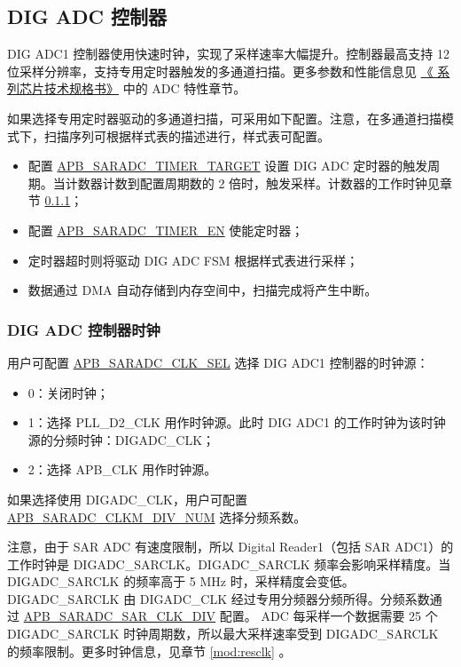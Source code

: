 \documentclass[main\_\_CN.tex]{subfiles}
\begin{document}
\subsection{DIG ADC 控制器}


DIG ADC1 控制器使用快速时钟，实现了采样速率大幅提升。控制器最高支持 12 位采样分辨率，支持专用定时器触发的多通道扫描。更多参数和性能信息见 \href{https://www.espressif.com/sites/default/files/documentation/esp32-s3_datasheet_cn.pdf}{《\chipname{} 系列芯片技术规格书》} 中的 ADC 特性章节。

如果选择专用定时器驱动的多通道扫描，可采用如下配置。注意，在多通道扫描模式下，扫描序列可根据样式表的描述进行，样式表可配置。
\begin{itemize}
        \item 配置 \hyperref[fielddesc:APBSARADCTIMERTARGET]{APB\_SARADC\_TIMER\_TARGET} 设置 DIG ADC 定时器的触发周期。当计数器计数到配置周期数的 2 倍时，触发采样。计数器的工作时钟见章节 \ref{sec:dig-adc-clock}；
        \item 配置 \hyperref[fielddesc:APBSARADCTIMEREN]{APB\_SARADC\_TIMER\_EN} 使能定时器；
        \item 定时器超时则将驱动 DIG ADC FSM 根据样式表进行采样；
        \item 数据通过 DMA 自动存储到内存空间中，扫描完成将产生中断。
\end{itemize}

\subsubsection{DIG ADC 控制器时钟}\label{sec:dig-adc-clock}

用户可配置 \hyperref[fielddesc:APBSARADCCLKSEL]{APB\_SARADC\_CLK\_SEL} 选择 DIG ADC1 控制器的时钟源：
\begin{itemize}
    \item 0：关闭时钟；
    \item 1：选择 PLL\_D2\_CLK 用作时钟源。此时 DIG ADC1 的工作时钟为该时钟源的分频时钟：DIGADC\_CLK；
    \item 2：选择 APB\_CLK 用作时钟源。
\end{itemize}

如果选择使用 DIGADC\_CLK，用户可配置 \hyperref[fielddesc:APBSARADCCLKMDIVNUM]{APB\_SARADC\_CLKM\_DIV\_NUM} 选择分频系数。

注意，由于 SAR ADC 有速度限制，所以 Digital Reader1（包括 SAR ADC1）的工作时钟是 DIGADC\_SARCLK。DIGADC\_SARCLK 频率会影响采样精度。当 DIGADC\_SARCLK 的频率高于 5 MHz 时，采样精度会变低。DIGADC\_SARCLK 由 DIGADC\_CLK 经过专用分频器分频所得。分频系数通过 \hyperref[fielddesc:APBSARADCSARCLKDIV]{APB\_SARADC\_SAR\_CLK\_DIV} 配置。
ADC 每采样一个数据需要 25 个 DIGADC\_SARCLK 时钟周期数，所以最大采样速率受到 DIGADC\_SARCLK 的频率限制。更多时钟信息，见章节 \ref{mod:resclk} \textit{}。
\end{document}
